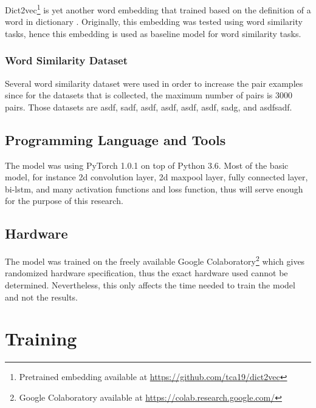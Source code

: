             Dict2vec\footnote{Pretrained embedding available at
            \url{https://github.com/tca19/dict2vec}} is yet another word
            embedding that trained based on the definition of a word in
            dictionary \citep{dict2vect2017tissier}. Originally, this
            embedding was tested using word similarity tasks, hence this
            embedding is used as baseline model for word similarity tasks.

        \subsubsection{Word Similarity Dataset}
            Several word similarity dataset were used in order to increase
            the pair examples since for the datasets that is collected,
            the maximum number of pairs is 3000 pairs. Those datasets are
            asdf, sadf, asdf, asdf, asdf, asdf, sadg, and asdfsadf.

    \subsection{Programming Language and Tools}
        The model was using PyTorch 1.0.1
        \citep{pytorch2017paszke} on top of Python 3.6. Most of the
        basic model, for instance 2d convolution layer, 2d maxpool
        layer, fully connected layer, bi-lstm, and many activation
        functions and loss function, thus will serve enough for the
        purpose of this research.
            
    \subsection{Hardware}
        The model was trained on the freely available Google
        Colaboratory\footnote{Google Colaboratory available at
        \url{https://colab.research.google.com/}} which gives randomized
        hardware specification, thus the exact hardware used cannot be
        determined. Nevertheless, this only affects the time needed to
        train the model and not the results.

\section{Training}
